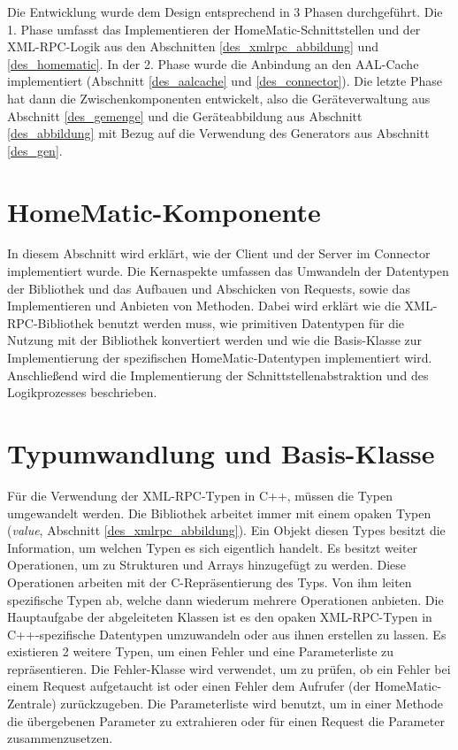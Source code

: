 Die Entwicklung wurde dem Design entsprechend in 3 Phasen durchgeführt.
Die 1. Phase umfasst das Implementieren der HomeMatic-Schnittstellen und der XML-RPC-Logik
aus den Abschnitten \ref{des_xmlrpc_abbildung} und \ref{des_homematic}.
In der 2. Phase wurde die Anbindung an den AAL-Cache implementiert (Abschnitt \ref{des_aalcache}
und \ref{des_connector}).
Die letzte Phase hat dann die Zwischenkomponenten entwickelt, also die Geräteverwaltung aus
Abschnitt \ref{des_gemenge} und die Geräteabbildung aus Abschnitt \ref{des_abbildung}
mit Bezug auf die Verwendung des Generators aus Abschnitt \ref{des_gen}.

\section{HomeMatic-Komponente}
\label{imp_hm}

In diesem Abschnitt wird erklärt, wie der Client und der Server im Connector implementiert wurde.
Die Kernaspekte umfassen das Umwandeln der Datentypen der Bibliothek und das Aufbauen und Abschicken
von Requests, sowie das Implementieren und Anbieten von Methoden.
Dabei wird erklärt wie die XML-RPC-Bibliothek benutzt werden muss, wie primitiven Datentypen für die
Nutzung mit der Bibliothek konvertiert werden und wie die Basis-Klasse zur Implementierung der spezifischen
HomeMatic-Datentypen implementiert wird.
Anschließend wird die Implementierung der Schnittstellenabstraktion und des Logikprozesses beschrieben.

\section{Typumwandlung und Basis-Klasse}
\label{imp_hm_typ}

Für die Verwendung der XML-RPC-Typen in C++, müssen die Typen umgewandelt werden.
Die Bibliothek arbeitet immer mit einem opaken Typen (\emph{value}, Abschnitt \ref{des_xmlrpc_abbildung}).
Ein Objekt diesen Types besitzt die Information, um welchen Typen es sich eigentlich handelt.
Es besitzt weiter Operationen, um zu Strukturen und Arrays hinzugefügt zu werden.
Diese Operationen arbeiten mit der C-Repräsentierung des Typs.
Von ihm leiten spezifische Typen ab, welche dann wiederum mehrere Operationen anbieten.
Die Hauptaufgabe der abgeleiteten Klassen ist es den opaken XML-RPC-Typen in C++-spezifische
Datentypen umzuwandeln oder aus ihnen erstellen zu lassen.
Es existieren 2 weitere Typen, um einen Fehler und eine Parameterliste zu repräsentieren.
Die Fehler-Klasse wird verwendet, um zu prüfen, ob ein Fehler bei einem Request aufgetaucht ist
oder einen Fehler dem Aufrufer (der HomeMatic-Zentrale) zurückzugeben.
Die Parameterliste wird benutzt, um in einer Methode die übergebenen Parameter zu extrahieren oder
für einen Request die Parameter zusammenzusetzen.

